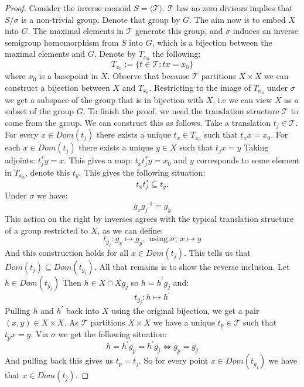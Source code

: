 \begin{corollary}
\begin{proof}
Consider the inverse monoid $S = \langle \mathcal{T} \rangle$. $\mathcal{T}$ has no zero divisors implies that $S/\sigma$ is a non-trivial group. Denote that group by $G$. The aim now is to embed $X$ into $G$. The maximal elements in $\mathcal{T}$ generate this group, and $\sigma$ induces an inverse semigroup homomorphism from $S$ into $G$, which is a bijection between the maximal elements and $G$. Denote by $T_{x_{0}}$ the following:
\begin{equation}
T_{x_{0}} := \lbrace t \in \mathcal{T} : tx=x_{0} \rbrace
\end{equation}
where $x_{0}$ is a basepoint in $X$. Observe that because $\mathcal{T}$ partitions $X \times X$ we can construct a bijection between $X$ and $T_{x_{0}}$. Restricting to the image of $T_{x_{0}}$ under $\sigma$ we get a subspace of the group that is in bijection with $X$, i.e we can view $X$ as a subset of the group $G$. To finish the proof, we need the translation structure $\mathcal{T}$ to come from the group. We can construct this as follows. Take a translation $t_{j} \in \mathcal{T}$. For every $x \in Dom(t_{j})$ there exists a unique $t_{x} \in T_{x_{0}}$ such that $t_{x}x=x_{0}$. For each $x \in Dom(t_{j})$ there exists a unique $y \in X$ such that $t_{j}x=y$ Taking adjoints: $t_{j}^{*}y=x$. This gives a map: $t_{x}t_{j}^{*}y=x_{0}$ and $y$ corresponds to some element in $T_{x_{0}}$, denote this $t_{y}$. This gives the following situation:
\begin{equation}
t_{x}t_{j}^{*} \subseteq t_{y}.
\end{equation} 
Under $\sigma$ we have:
\begin{equation}
g_{x}g_{j}^{-1}=g_{y}
\end{equation}
This action on the right by inverses agrees with the typical translation structure of a group restricted to $X$, as we can define:
\begin{equation}
t_{g_{j}}:g_{x} \mapsto g_{y}, \mbox{ using $\sigma$; } x \mapsto y
\end{equation}
And this construction holds for all $x\in Dom(t_{j})$. This tells us that $Dom(t_{j}) \subseteq Dom(t_{g_{j}})$. All that remains is to show the reverse inclusion. Let $h \in Dom(t_{g_{j}})$ Then $h \in X \cap Xg_{j}$ so $h=h^{'}g_{j}$ and:
\begin{equation}
t_{g_{j}}:h \mapsto h^{'}
\end{equation}
Pulling $h$ and $h^{'}$ back into $X$ using the original bijection, we get a pair $(x,y) \in X \times X$. As $\mathcal{T}$ partitions $X\times X$ we have a unique $t_{p} \in \mathcal{T}$ such that $t_{p}x=y$. Via $\sigma$ we get the following situation:
\begin{equation}
h=h^{'}g_{p}=h^{'}g_{j} \Leftrightarrow g_{p}=g_{j}
\end{equation}
And pulling back this gives us $t_{p}=t_{j}$. So for every point $x\in Dom(t_{g_{j}})$ we have that $x \in Dom(t_{j})$.


\end{proof}
\end{corollary}
